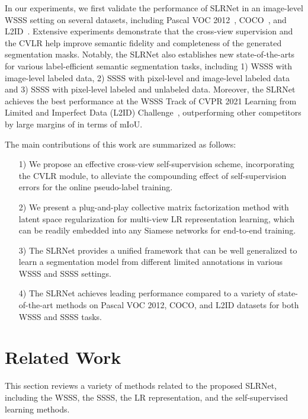 \documentclass[twocolumn]{svjour3}          \smartqed  \usepackage{graphicx}
\def\name{SLRNet}
\begin{document}
In our experiments, we first validate the performance of SLRNet in an image-level WSSS setting on several datasets, including Pascal VOC 2012~\citep{EveringhamGWWZ10:VOC}, COCO~\citep{LinMBHPRDZ14:COCO}, and L2ID~\citep{YunchaoWei2020:lid20}.
Extensive experiments demonstrate that the cross-view supervision and the CVLR help improve semantic fidelity and completeness of the generated segmentation masks.
Notably, the SLRNet also establishes new state-of-the-arts for various label-efficient semantic segmentation tasks, including 1) WSSS with image-level labeled data, 2) SSSS with pixel-level and image-level labeled data and 3) SSSS with pixel-level labeled and unlabeled data.
Moreover, the SLRNet achieves the best performance at the WSSS Track of CVPR 2021
Learning from Limited and Imperfect Data (L2ID) Challenge~\citep{YunchaoWei2020:lid20}, outperforming other competitors by large margins of  in terms of mIoU.

The main contributions of this work are summarized as follows:
\begin{itemize}
  \item[1)] We propose an effective cross-view self-supervision scheme, incorporating the CVLR module, to alleviate the compounding effect of self-supervision errors for the online pseudo-label training.
  \item[2)] We present a plug-and-play collective matrix factorization method with latent space regularization for multi-view LR representation learning, which can be readily embedded into any Siamese networks for end-to-end training.   \item[3)] The SLRNet provides a unified framework that can be well generalized to learn a segmentation model from different limited annotations in various WSSS and SSSS settings.
  \item[4)] The SLRNet achieves leading performance compared to a variety of state-of-the-art methods on Pascal VOC 2012, COCO, and L2ID datasets for both WSSS and SSSS tasks.
\end{itemize}


\section{Related Work}
This section reviews a variety of methods related to the proposed {\name}, including the WSSS, the SSSS, the LR representation, and the self-supervised learning methods.
\end{document}
